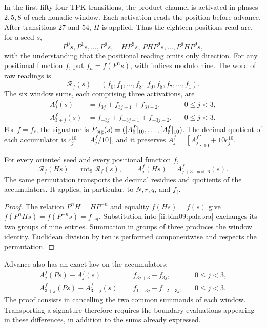 In the first fifty-four TPK transitions, the product channel
is activated in phases $2,5,8$ of each nonadic window. Each activation
reads the position before advance. After transitions $27$ and $54$,
$H$ is applied. Thus the eighteen positions read are, for a
seed $s$,
\[
 P^0s,P^1s,\ldots,P^8s,\quad
 HP^9s,\,P H P^9s,\ldots,P^8H P^9s,
\]
with the understanding that the positional reading omits only direction.
For any positional function $f$, put $f_n=f(P^ns)$, with
indices modulo nine. The word of raw readings is
\begin{equation}
 \mathcal R_f(s)=
 (f_0,f_1,\ldots,f_8,\ f_0,f_8,f_7,\ldots,f_1).
 \label{ii:bim09:palabra}
\end{equation}
The six window sums, each comprising three activations, are
\begin{align}
 A_j^f(s)&=f_{3j}+f_{3j+1}+f_{3j+2},&&0\leq j<3,\label{ii:bim09:ida}\\
 A_{3+j}^f(s)&=f_{-3j}+f_{-3j-1}+f_{-3j-2},&&0\leq j<3.
 \label{ii:bim09:vuelta}
\end{align}
For $f=f_\ell$, the signature is
$E_{\rm sig}(s)=([A_0^f]_{10},\ldots,[A_5^f]_{10})$.
The decimal quotient of each accumulator is
$c_j^{10}=\lfloor A_j^f/10\rfloor$, and it preserves
$A_j^f=[A_j^f]_{10}+10c_j^{10}$.

\begin{proposition}
\label{ii:bim09:media-vuelta}
For every oriented seed and every positional function $f$,
\[
 \mathcal R_f(Hs)=\operatorname{rot}_9\mathcal R_f(s),\qquad
 A_j^f(Hs)=A_{j+3\bmod6}^f(s).
\]
The same permutation transports the decimal residues and quotients
of the accumulators. It applies, in particular, to $N,r,q$, and $f_\ell$.
\end{proposition}
\begin{proof}
The relation $P^nH=HP^{-n}$ and equality $f(Hs)=f(s)$ give
$f(P^nHs)=f(P^{-n}s)=f_{-n}$. Substitution into
\eqref{ii:bim09:palabra} exchanges its two groups of nine entries.
Summation in groups of three produces the window identity. Euclidean
division by ten is performed componentwise and respects the
permutation.
\end{proof}

Advance also has an exact law on the accumulators:
\begin{align}
 A_j^f(Ps)-A_j^f(s)&=f_{3j+3}-f_{3j},&&0\leq j<3,
 \label{ii:bim09:avance-ida}\\
 A_{3+j}^f(Ps)-A_{3+j}^f(s)&=f_{1-3j}-f_{-2-3j},&&0\leq j<3.
 \label{ii:bim09:avance-vuelta}
\end{align}
The proof consists in cancelling the two common summands of each window. Transporting a signature therefore requires the boundary evaluations appearing in these differences, in addition to the sums already expressed.


